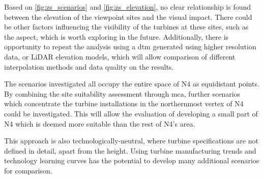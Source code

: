 Based on \autoref{fig:zs_scenarios} and \autoref{fig:zs_elevation}, no clear relationship is found between the elevation of the viewpoint sites and the visual impact. There could be other factors influencing the visibility of the turbines at these sites, such as the aspect, which is worth exploring in the future. Additionally, there is opportunity to repeat the analysis using a \gls{dtm} generated using higher resolution data, or LiDAR elevation models, which will allow comparison of different interpolation methods and data quality on the results.

The scenarios investigated all occupy the entire space of N4 as equidistant points. By combining the site suitability assessment through \gls{mca}, further scenarios which concentrate the turbine installations in the northernmost vertex of N4 could be investigated. This will allow the evaluation of developing a small part of N4 which is deemed more suitable than the rest of N4's area.

This approach is also technologically-neutral, where turbine specifications are not defined in detail, apart from the height. Using turbine manufacturing trends and technology learning curves has the potential to develop many additional scenarios for comparison.
